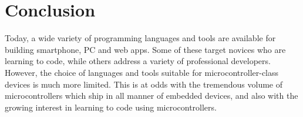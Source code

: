 \section{Conclusion}
\label{sec:conclude}


Today, a wide variety of programming languages and tools are available for building smartphone, PC and web apps. Some of these target novices who are learning to code, while others address a variety of professional developers. However, the choice of languages and tools suitable for microcontroller-class devices is much more limited. This is at odds with the tremendous volume of microcontrollers which ship in all manner of embedded devices, and also with the growing interest in learning to code using microcontrollers. 


